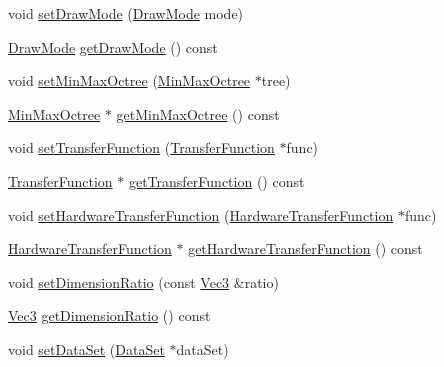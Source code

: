 \begin{DoxyCompactItemize}
\item 
void \hyperlink{class_verdi_1_1_render_context_ad8043e240458d13ed097bb325a37f0db}{set\-Draw\-Mode} (\hyperlink{class_verdi_1_1_render_context_a57f01ede0284c624c24fc1660075fecc}{\-Draw\-Mode} mode)
\item 
\hyperlink{class_verdi_1_1_render_context_a57f01ede0284c624c24fc1660075fecc}{\-Draw\-Mode} \hyperlink{class_verdi_1_1_render_context_ab1d25c67e4eaffe79a0588b61ce7f775}{get\-Draw\-Mode} () const 
\item 
void \hyperlink{class_verdi_1_1_render_context_a0eb3dba4ce5a67eaae20bd35978b204a}{set\-Min\-Max\-Octree} (\hyperlink{class_verdi_1_1_min_max_octree}{\-Min\-Max\-Octree} $\ast$tree)
\item 
\hyperlink{class_verdi_1_1_min_max_octree}{\-Min\-Max\-Octree} $\ast$ \hyperlink{class_verdi_1_1_render_context_ab3eb7b60dbe3a3d311559630d153e790}{get\-Min\-Max\-Octree} () const 
\item 
void \hyperlink{class_verdi_1_1_render_context_a0c1b975894b8e2fd6bf06ac04acbb9b0}{set\-Transfer\-Function} (\hyperlink{class_verdi_1_1_transfer_function}{\-Transfer\-Function} $\ast$func)
\item 
\hyperlink{class_verdi_1_1_transfer_function}{\-Transfer\-Function} $\ast$ \hyperlink{class_verdi_1_1_render_context_a7ba0eaedeca81347c1dc29b42c4e9cb2}{get\-Transfer\-Function} () const 
\item 
void \hyperlink{class_verdi_1_1_render_context_ab17d510bffc88c9ecba3116ab9de08a9}{set\-Hardware\-Transfer\-Function} (\hyperlink{class_verdi_1_1_hardware_transfer_function}{\-Hardware\-Transfer\-Function} $\ast$func)
\item 
\hyperlink{class_verdi_1_1_hardware_transfer_function}{\-Hardware\-Transfer\-Function} $\ast$ \hyperlink{class_verdi_1_1_render_context_ac9dfb284d6228fe9f12bad8844300568}{get\-Hardware\-Transfer\-Function} () const 
\item 
void \hyperlink{class_verdi_1_1_render_context_a123de8573a694eef5a20640f1caf3c0a}{set\-Dimension\-Ratio} (const \hyperlink{class_verdi_1_1_vec3}{\-Vec3} \&ratio)
\item 
\hyperlink{class_verdi_1_1_vec3}{\-Vec3} \hyperlink{class_verdi_1_1_render_context_a6df0d36be0a8a104f3669806b45b7e21}{get\-Dimension\-Ratio} () const 
\item 
void \hyperlink{class_verdi_1_1_render_context_a4f7e365a9c9fe65dd0c2b65542c8b1ac}{set\-Data\-Set} (\hyperlink{class_verdi_1_1_data_set}{\-Data\-Set} $\ast$data\-Set)
\item 

\end{DoxyCompactItemize}
